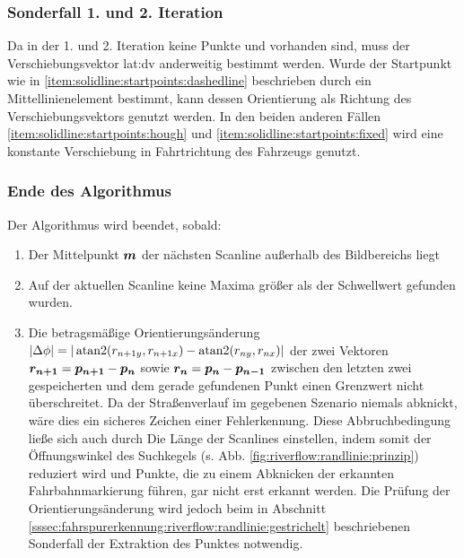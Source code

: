 \subsubsection{Sonderfall 1. und 2. Iteration}
Da in der 1. und 2. Iteration keine Punkte  und  vorhanden sind, muss der Verschiebungsvektor \gls{lat:dv} anderweitig bestimmt werden. 
Wurde der Startpunkt wie in \ref{item:solidline:startpoints:dashedline} beschrieben durch ein Mittellinienelement bestimmt, kann dessen Orientierung als Richtung des Verschiebungsvektors genutzt werden.
In den beiden anderen Fällen \ref{item:solidline:startpoints:hough} und \ref{item:solidline:startpoints:fixed} wird eine konstante Verschiebung in Fahrtrichtung des Fahrzeugs genutzt.

\subsubsection{Ende des Algorithmus}
Der Algorithmus wird beendet, sobald:
\begin{enumerate}
\item  
Der Mittelpunkt \begin{math} \boldsymbol{m}  \end{math} der nächsten Scanline außerhalb des Bildbereichs liegt
\item \label{item:fahrspurerkennung:riverflow:randlinie:ende:keinpunkt}
Auf der aktuellen Scanline keine Maxima größer als der Schwellwert  gefunden wurden.
\item 
Die betragsmäßige Orientierungsänderung \(|\Delta \phi| = |\operatorname{atan2}(r_{n+1 y}, r_{n+1 x}) - \operatorname{atan2}(r_{n y}, r_{n x})|\) der zwei Vektoren \(\boldsymbol{r_{n+1}}=\boldsymbol{p_{n+1}}-\boldsymbol{p_{n}}\) sowie \(\boldsymbol{r_{n}}=\boldsymbol{p_{n}}-\boldsymbol{p_{n-1}}\) zwischen den letzten zwei gespeicherten und dem gerade gefundenen Punkt einen Grenzwert nicht überschreitet. Da der Straßenverlauf im gegebenen Szenario niemals abknickt, wäre dies ein sicheres Zeichen einer Fehlerkennung. Diese Abbruchbedingung ließe sich auch durch Die Länge der Scanlines einstellen, indem somit der Öffnungswinkel des Suchkegels (s. Abb. \ref{fig:riverflow:randlinie:prinzip}) reduziert wird und Punkte, die zu einem Abknicken der erkannten Fahrbahnmarkierung führen, gar nicht erst erkannt werden. 
Die Prüfung der Orientierungsänderung wird jedoch beim in Abschnitt \ref{sssec:fahrspurerkennung:riverflow:randlinie:gestrichelt} beschriebenen Sonderfall der Extraktion des Punktes  notwendig.
\end{enumerate}

